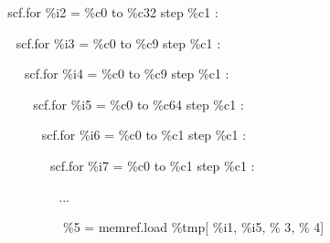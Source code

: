 {\color{color02} \,\,\,\,scf.for} {\color{color05} \%i2} = {\color{color05} \%c0} {\color{color06} to} 
{\color{color05} \%c32} {\color{color06} step} {\color{color05} \%c1} :

{\color{color02} \,\,\,\,\,\,\,\,scf.for} {\color{color05} \%i3} = {\color{color05} \%c0} 
{\color{color06} to} {\color{color05} \%c9} {\color{color06} step} {\color{color05} \%c1} 
:

{\color{color02} \,\,\,\,\,\,\,\,\,\,\,\,scf.for} {\color{color05} \%i4} = {\color{color05} \%c0} 
{\color{color06} to} {\color{color05} \%c9} {\color{color06} step} {\color{color05} \%c1} 
:

{\color{color02} \,\,\,\,\,\,\,\,\,\,\,\,\,\,\,\,scf.for} {\color{color05} \%i5} = {\color{color05} \%c0} 
{\color{color06} to} {\color{color05} \%c64} {\color{color06} step} {\color{color05} \%c1} 
:

{\color{color02} \,\,\,\,\,\,\,\,\,\,\,\,\,\,\,\,\,\,\,\,scf.for} {\color{color05} \%i6} = {\color{color05} \%c0} 
{\color{color06} to} {\color{color05} \%c1} {\color{color06} step} {\color{color05} \%c1} 
:

{\color{color02} \,\,\,\,\,\,\,\,\,\,\,\,\,\,\,\,\,\,\,\,\,\,\,\,scf.for} {\color{color05} \%i7} = {\color{color05} \%c0} 
{\color{color06} to} {\color{color05} \%c1} {\color{color06} step} {\color{color05} \%c1} 
:

\,\,\,\,\,\,\,\,\,\,\,\,\,\,\,\,\,\,\,\,\,\,\,\,\,\,\,\,...

\,\,\,\,\,\,\,\,\,\,\,\,\,\,\,\,\,\,\,\,\,\,\,\,\,\,\,\,{\color{color05} \%5} = {\color{color02} memref.load} 
{\color{color05} \%tmp}[{\color{color05} \%i1}, {\color{color05} \%i5}, \%{\color{color07} 3}, 
\%{\color{color07} 4}]


